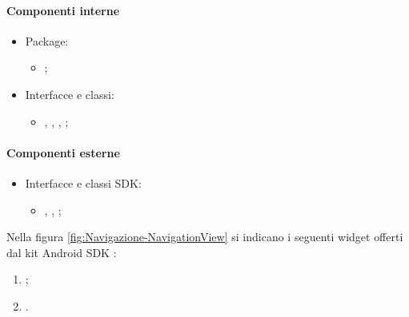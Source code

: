\documentclass[../Funzionalita.tex]{subfiles}
\begin{document}
			\paragraph*{Componenti interne}
			\begin{itemize}
			
				\item Package:
				\begin{itemize}
					\item[] \view;
				\end{itemize}
				
				\item Interfacce e classi:
				\begin{itemize}
					\item[] \PoiCategoryView, \PoiCategoryViewImp, \NavigationView, \NavigationViewImp;
				\end{itemize}
				
			\end{itemize}
			
			
			\paragraph*{Componenti esterne}
			\begin{itemize}
				\item Interfacce e classi SDK:
				\begin{itemize}
					\item[] \AdapterView, \ArrayAdapter, \ListView;
				\end{itemize}
			\end{itemize}
			
			Nella figura \ref{fig:Navigazione-NavigationView} si indicano i seguenti widget offerti dal kit \gls{Android} SDK :
			\begin{enumerate}
				\item \Toolbar;
				\item \ListView.
			\end{enumerate}
		
\end{document}
